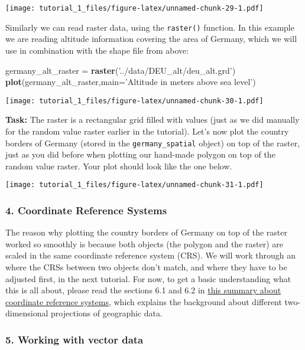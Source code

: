 \documentclass[]{article}
\newenvironment{Shaded}{\begin{snugshade}}{\end{snugshade}}
\newcommand{\DataTypeTok}[1]{\textcolor[rgb]{0.13,0.29,0.53}{#1}}
\newcommand{\KeywordTok}[1]{\textcolor[rgb]{0.13,0.29,0.53}{\textbf{#1}}}
\newcommand{\NormalTok}[1]{#1}
\newcommand{\StringTok}[1]{\textcolor[rgb]{0.31,0.60,0.02}{#1}}
\begin{document}
\texttt{[image: tutorial\_1\_files/figure-latex/unnamed-chunk-29-1.pdf]}

Similarly we can read raster data, using the \texttt{raster()} function.
In this example we are reading altitude information covering the area of
Germany, which we will use in combination with the shape file from
above:

\begin{Shaded}
\begin{Highlighting}[]
\NormalTok{germany_alt_raster =}\StringTok{ }\KeywordTok{raster}\NormalTok{(}\StringTok{'../data/DEU_alt/deu_alt.grd'}\NormalTok{)}
\KeywordTok{plot}\NormalTok{(germany_alt_raster,}\DataTypeTok{main=}\StringTok{'Altitude in meters above sea level'}\NormalTok{)}
\end{Highlighting}
\end{Shaded}

\texttt{[image: tutorial\_1\_files/figure-latex/unnamed-chunk-30-1.pdf]}

\textbf{Task:} The raster is a rectangular grid filled with values (just
as we did manually for the random value raster earlier in the tutorial).
Let's now plot the country borders of Germany (stored in the
\texttt{germany\_spatial} object) on top of the raster, just as you did
before when plotting our hand-made polygon on top of the random value
raster. Your plot should look like the one below.

\texttt{[image: tutorial\_1\_files/figure-latex/unnamed-chunk-31-1.pdf]}

\hypertarget{coordinate-reference-systems}{%
\subsubsection{4. Coordinate Reference
Systems}\label{coordinate-reference-systems}}

The reason why plotting the country borders of Germany on top of the
raster worked so smoothly is because both objects (the polygon and the
raster) are scaled in the same coordinate reference system (CRS). We
will work through an where the CRSs between two objects don't match, and
where they have to be adjusted first, in the next tutorial. For now, to
get a basic understanding what this is all about, please read the
sections 6.1 and 6.2 in
\href{http://rspatial.org/spatial/rst/6-crs.html}{this summary about
coordinate reference systems}, which explains the background about
different two-dimensional projections of geographic data.

\hypertarget{working-with-vector-data}{%
\subsubsection{5. Working with vector
data}\label{working-with-vector-data}}
\end{document}

